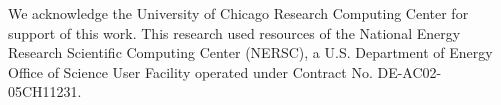 \documentclass[\docopts]{\docclass}
\begin{document}
We acknowledge the University of Chicago Research Computing Center for support of this work.
This research used resources of the National Energy Research Scientific Computing Center (NERSC), a U.S. Department of Energy Office of Science User Facility operated under Contract No. DE-AC02-05CH11231.



%
%




\end{document}

